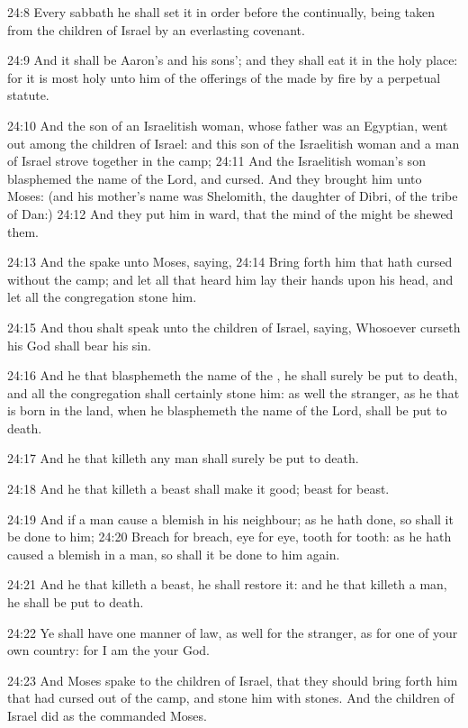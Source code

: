 24:8 Every sabbath he shall set it in order before the \LORD
continually, being taken from the children of Israel by an everlasting
covenant.

24:9 And it shall be Aaron's and his sons'; and they shall eat it in
the holy place: for it is most holy unto him of the offerings of the
\LORD made by fire by a perpetual statute.

24:10 And the son of an Israelitish woman, whose father was an
Egyptian, went out among the children of Israel: and this son of the
Israelitish woman and a man of Israel strove together in the camp;
24:11 And the Israelitish woman's son blasphemed the name of the Lord,
and cursed. And they brought him unto Moses: (and his mother's name
was Shelomith, the daughter of Dibri, of the tribe of Dan:) 24:12 And
they put him in ward, that the mind of the \LORD might be shewed them.

24:13 And the \LORD spake unto Moses, saying, 24:14 Bring forth him
that hath cursed without the camp; and let all that heard him lay
their hands upon his head, and let all the congregation stone him.

24:15 And thou shalt speak unto the children of Israel, saying,
Whosoever curseth his God shall bear his sin.

24:16 And he that blasphemeth the name of the \LORD, he shall surely be
put to death, and all the congregation shall certainly stone him: as
well the stranger, as he that is born in the land, when he blasphemeth
the name of the Lord, shall be put to death.

24:17 And he that killeth any man shall surely be put to death.

24:18 And he that killeth a beast shall make it good; beast for beast.

24:19 And if a man cause a blemish in his neighbour; as he hath done,
so shall it be done to him; 24:20 Breach for breach, eye for eye,
tooth for tooth: as he hath caused a blemish in a man, so shall it be
done to him again.

24:21 And he that killeth a beast, he shall restore it: and he that
killeth a man, he shall be put to death.

24:22 Ye shall have one manner of law, as well for the stranger, as
for one of your own country: for I am the \LORD your God.

24:23 And Moses spake to the children of Israel, that they should
bring forth him that had cursed out of the camp, and stone him with
stones. And the children of Israel did as the \LORD commanded Moses.

